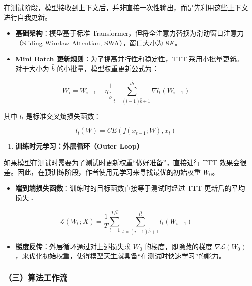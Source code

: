在测试阶段，模型接收到上下文后，并非直接一次性输出，而是先利用这些上下文进行自我更新。

\begin{itemize}
\tightlist
\item
  \textbf{基础架构}：模型基于标准 Transformer，但将全注意力替换为滑动窗口注意力（Sliding-Window Attention, SWA），窗口大小为 \(8K\)。
\item
  \textbf{Mini-Batch 更新规则}：为了提高并行性和稳定性，TTT 采用小批量更新。对于大小为 \(\hat b\) 的小批量，模型权重更新公式为：
\end{itemize}

\[
W_i = W_{i-1}
- \eta\frac{1}{\hat b}
\sum_{t=(i-1)\hat b+1}^{i\hat b}
\nabla l_t(W_{i-1})
\]

其中 \(l_t\) 是标准交叉熵损失函数：

\[
l_t(W)=CE(f(x_{t-1};W),x_t)
\]

\begin{enumerate}
\def\labelenumi{\arabic{enumi}.}
\setcounter{enumi}{1}
\tightlist
\item
  \textbf{训练时元学习：外层循环（Outer Loop）}
\end{enumerate}

如果模型在测试时需要为了测试时更新权重``做好准备''，直接进行 TTT 效果会很差。因此，在预训练阶段，作者使用元学习来寻找最优的初始权重 \(W_0\)。

\begin{itemize}
\tightlist
\item
  \textbf{端到端损失函数}：训练时的目标函数直接等于测试时经过 TTT 更新后的平均损失：
\end{itemize}

\[
\mathcal{L}(W_0;X)=
\frac{1}{T}\sum_{i=1}^{T/\hat b}\sum_{t=(i-1)\hat b+1}^{i\hat b}
l_t(W_{i-1})
\]

\begin{itemize}
\tightlist
\item
  \textbf{梯度反传}：外层循环通过对上述损失求 \(W_0\) 的梯度，即隐藏的梯度 \(\nabla\mathcal{L}(W_0)\)，来优化初始权重，使得模型天生就具备``在测试时快速学习''的能力。
\end{itemize}

\hypertarget{ux4e09ux7b97ux6cd5ux5de5ux4f5cux6d41}{%
\subsubsection{（三）算法工作流}\label{ux4e09ux7b97ux6cd5ux5de5ux4f5cux6d41}}

